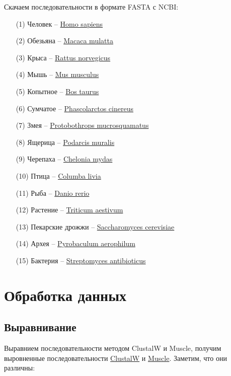 Скачаем последовательности в формате FASTA с NCBI:
\begin{enumerate}
\item[(1)] Человек -- \href{https://www.ncbi.nlm.nih.gov/protein/AAA03081.1}{Homo sapiens}
\item[(2)] Обезьяна -- \href{https://www.ncbi.nlm.nih.gov/protein/NP_001180485.1}{Macaca mulatta}
\item[(3)] Крыса -- \href{https://www.ncbi.nlm.nih.gov/protein/NP_001094004.1}{Rattus norvegicus}
\item[(4)] Мышь -- \href{https://www.ncbi.nlm.nih.gov/protein/AAA40069.1}{Mus musculus}
\item[(5)] Копытное -- \href{https://www.ncbi.nlm.nih.gov/protein/AAX46363.1}{Bos taurus}
\item[(6)] Сумчатое -- \href{https://www.ncbi.nlm.nih.gov/protein/XP_020826680.1}{Phascolarctos cinereus}
\item[(7)] Змея -- \href{https://www.ncbi.nlm.nih.gov/protein/XP_015672644.1}{Protobothrops mucrosquamatus}
\item[(8)] Ящерица -- \href{https://www.ncbi.nlm.nih.gov/protein/XP_028592540.1}{Podarcis muralis}
\item[(9)] Черепаха -- \href{https://www.ncbi.nlm.nih.gov/protein/EMP32282.1}{Chelonia mydas}
\item[(10)] Птица -- \href{https://www.ncbi.nlm.nih.gov/protein/PKK33771.1}{Columba livia}
\item[(11)] Рыба -- \href{https://www.ncbi.nlm.nih.gov/protein/AAS66968.1}{Danio rerio}
\item[(12)] Растение -- \href{https://www.ncbi.nlm.nih.gov/protein/AAW50989.1}{Triticum aestivum}
\item[(13)] Пекарские дрожжи -- \href{https://www.ncbi.nlm.nih.gov/protein/AAA34982.1}{Saccharomyces cerevisiae}
\item[(14)] Архея -- \href{https://www.ncbi.nlm.nih.gov/protein/AAL64858.1}{Pyrobaculum aerophilum}
\item[(15)] Бактерия -- \href{https://www.ncbi.nlm.nih.gov/protein/AAA26811.1}{Streptomyces antibioticus}
\end{enumerate}

\newpage
\section{Обработка данных}
\subsection*{Выравнивание}
Выравнием последовательности методом ClustalW и Muscle, получим выровненные последовательности \href{https://drive.google.com/file/d/1HtNPjupakaTaff6-jQJAMWBIQIxa2x7V/view?usp=sharing}{ClustalW} и \href{https://drive.google.com/file/d/1UYL78IIqOBh-07wvJQBQxqB1CJfv0uhB/view?usp=sharing}{Muscle}.
\vskip 0.1in
Заметим, что они различны:

